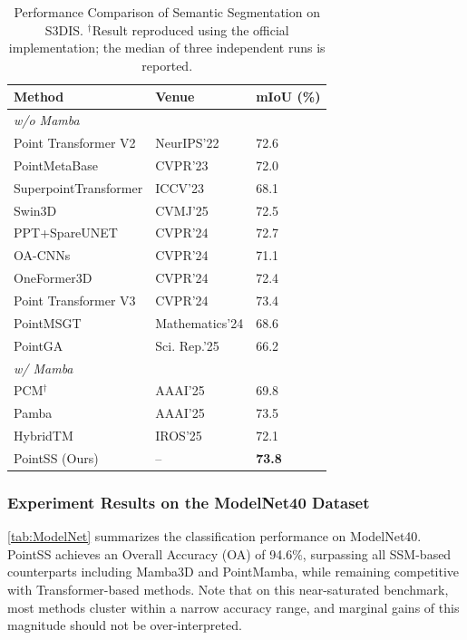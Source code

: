 \documentclass[letterpaper,journal]{IEEEtran}
\begin{document}
\begin{table}[!t]
\centering
\caption{Performance Comparison of Semantic Segmentation on S3DIS. $^\dagger$Result reproduced using the official implementation; the median of three independent runs is reported.}
\label{tab:s3dis}
\begin{tabular}{@{}lll@{}}
\toprule
\textbf{Method} & \textbf{Venue} & \textbf{mIoU (\%)} \\ \midrule
\multicolumn{3}{l}{\textit{w/o Mamba}} \\
Point Transformer V2\cite{ptv2} & NeurIPS'22 & 72.6 \\
PointMetaBase\cite{pmb} & CVPR'23 & 72.0 \\
SuperpointTransformer\cite{spt} & ICCV'23 & 68.1 \\
Swin3D\cite{Swin3D} & CVMJ'25 & 72.5 \\
PPT+SpareUNET\cite{ppt} & CVPR'24 & 72.7 \\
OA-CNNs\cite{oacnn} & CVPR'24 & 71.1 \\
OneFormer3D\cite{OneFormer3D} & CVPR'24 & 72.4 \\
Point Transformer V3\cite{ptv3} & CVPR'24 & 73.4 \\
PointMSGT\cite{pointmsgt} & Mathematics'24 & 68.6 \\
PointGA\cite{pointga} & Sci. Rep.'25 & 66.2 \\ \midrule
\multicolumn{3}{l}{\textit{w/ Mamba}} \\
PCM$^\dagger$\cite{pcm} & AAAI'25 & 69.8 \\
Pamba\cite{pamba} & AAAI'25 & 73.5 \\
HybridTM\cite{hybridtm} & IROS'25 & 72.1 \\
PointSS (Ours) & -- & \textbf{73.8} \\ \bottomrule
\end{tabular}
\end{table}

\subsubsection{Experiment Results on the ModelNet40 Dataset}

\cref{tab:ModelNet} summarizes the classification performance on ModelNet40. PointSS achieves an Overall Accuracy (OA) of 94.6\%, surpassing all SSM-based counterparts including Mamba3D and PointMamba, while remaining competitive with Transformer-based methods. Note that on this near-saturated benchmark, most methods cluster within a narrow accuracy range, and marginal gains of this magnitude should not be over-interpreted.
\end{document}
